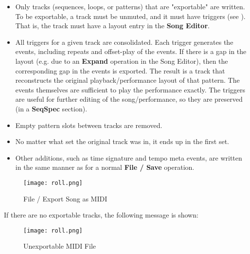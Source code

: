    \begin{itemize}
      \item Only tracks (sequences, loops, or patterns)
         that are "exportable" are written.  To be exportable, a
         track must be unmuted, and it must have triggers (see
         ).  That is,
         the track must have a layout entry in the \textbf{Song Editor}.
      \item All triggers for a given track are consolidated.
         Each trigger generates the events, including repeats and
         offset-play of the events.
         If there is a gap in the layout
         (e.g. due to an \textbf{Expand} operation in the Song Editor),
         then the corresponding gap in the events is exported.
         The result is a track that reconstructs the original
         playback/performance layout of that pattern.
         The events themselves are sufficient to play the performance exactly.
         The triggers are useful for further editing of the song/performance,
         so they are preserved (in a \textbf{SeqSpec} section).
      \item Empty pattern slots between tracks are removed.
      \item No matter what set the original track was in, it ends up in the
         first set.
      \item Other additions, such as time signature and tempo meta events, are
         written in the same manner as for a normal \textbf{File / Save}
         operation.
   \end{itemize}

\begin{figure}[H]
   \centering 
   \texttt{[image: roll.png]}
   \caption{File / Export Song as MIDI}
   \label{fig:seq66_midi_export_file_export}
\end{figure}

   If there are no exportable tracks, the following message is shown:

\begin{figure}[H]
   \centering 
   \texttt{[image: roll.png]}
   \caption{Unexportable MIDI File}
   \label{fig:seq66_midi_export_file_unexportable}
\end{figure}

